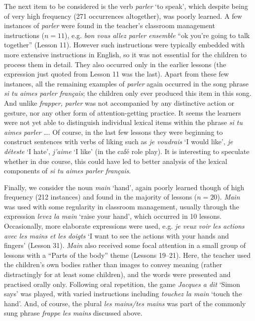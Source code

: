 \documentclass[output=paper]{langscibook}
\begin{document}
The next item to be considered is the verb \textit{parler} `to speak', which despite being of very high frequency (271 occurrences altogether), was poorly learned. A few instances of \textit{parler} were found in the teacher’s classroom management instructions ($n =11$), e.g. \textit{bon vous allez parler ensemble} ``ok you’re going to talk together'' (Lesson 11). However such instructions were typically embedded with more extensive instructions in English, so it was not essential for the children to process them in detail. They also occurred only in the earlier lessons (the expression just quoted from Lesson 11 was the last). Apart from these few instances, all the remaining examples of \textit{parler} again occurred in the song phrase \textit{si tu aimes parler français}; the children only ever produced this item in this song. And unlike \textit{frapper, parler} was not accompanied by any distinctive action or gesture, nor any other form of attention-getting practice. It seems the learners were not yet able to distinguish individual lexical items within the phrase \textit{si tu aimes parler} \ldots. Of course, in the last few lessons they were beginning to construct sentences with verbs of liking such as \textit{je voudrais} `I would like', \textit{je déteste} `I hate', \textit{j’aime} `I like' (in the café role play). It is interesting to speculate whether in due course, this could have led to better analysis of the lexical components of \textit{si tu aimes parler français}.

Finally, we consider the noun \textit{main} `hand', again poorly learned though of high frequency (212 instances) and found in the majority of lessons ($n = 20$). \textit{Main} was used with some regularity in classroom management, usually through the expression \textit{levez la main} `raise your hand', which occurred in 10 lessons. Occasionally, more elaborate expressions were used, e.g. \textit{je veux voir les actions avec les mains et les doigts} `I want to see the actions with your hands and fingers' (Lesson 31). \textit{Main} also received some focal attention in a small group of lessons with a ``Parts of the body'' theme (Lessons 19--21). Here, the teacher used the children’s own bodies rather than images to convey meaning (rather distractingly for at least some children), and the words were presented and practised orally only. Following oral repetition, the game \textit{Jacques a dit} `Simon says' was played, with varied instructions including \textit{touchez la main} `touch the hand'. And, of course, the plural \textit{les mains/tes mains} was part of the commonly sung phrase \textit{frappe les mains} discussed above.
\end{document}
